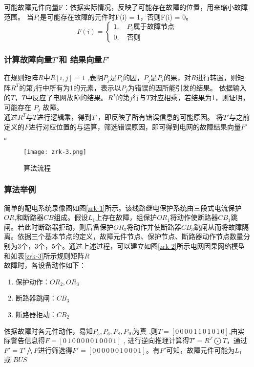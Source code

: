 \documentclass[withoutpreface,bwprint]{cumcmthesis} %
\begin{document}
可能故障元件向量F：依据实际情况，反映了可能存在故障的位置，用来缩小故障范围。
当$P_i$是可能存在故障的元件时F(i) = 1，否则F(i) = 0。
\begin{equation}
    F(i) = 
    \begin{cases}
        1 , \quad P_i\text{属于故障节点} \\
        0 , \quad \text{否则}
    \end{cases}
\end{equation}

\subsubsection{计算故障向量$T'$和 结果向量$F'$}
在规则矩阵$R$中$R[i,j] = 1$ ,表明$P_j$是$P_i$的因，$P_j$是$P_i$的果，对$R$进行转置，则矩阵$R^T$的第$j$行中所有为1的元素，表示以$P_j$为错误的因所能引发的结果。
依据输入的$T$，$T$中反应了电网故障的结果。$R^T$的第$j$行与$T$对应相乘，若结果为1，则证明，可能存在 $P_j$ 故障。\\ 
\indent 通过$R^T$与$T$进行逻辑乘，得到$T'$，即反映了所有错误信息的可能原因。 将$T'$与之前定义的$F$进行对应位置的与运算，筛选错误原因，即可得到电网的故障结果向量$F'$。

\begin{figure}[htbp]
    \centering
    \texttt{[image: zrk-3.png]}
    \caption{算法流程}
\end{figure}

\subsubsection{算法举例}
简单的配电系统录像图如图\ref{zrk-1}所示。该线路继电保护系统由三段式电流保护$OR$,和断路器$CB$组成。假设$L_1$上存在故障，组保护$OR_1$将动作使断路器$CB_1$跳闸。若此时断路器拒动，则后备保护$OR_3$将动作并使断路器$CB_3$跳闸从而将故障隔离。依据三个基本节点的定义，故障元件节点、保护节点、断路器动作节点数量分别为3个，3个，5个。通过上述过程，可以建立如图\ref{zrk-2}所示电网因果网络模型和如表\ref{zrk-3}所示规则矩阵$R$\\
\indent 故障时，各设备动作如下：
\begin{enumerate}[itemindent=4em]
    \item 保护动作：$OR_2 , OR_3$
    \item 断路器跳闸：$CB_3$
    \item 断路器拒动：$CB_2$
\end{enumerate}
依据故障时各元件动作，易知$P_5 , P_6 , P_8 , P_{10}$为真 ,则$T = [0\,0\,0\,0\,1\,1\,0\,1\,0\,1\,0]$,由实际警告信息得$ F = [0\,1\,0\,0\,0\,0\,0\,1\,0\,0\,0\,1]$ , 进行逆向推理计算得$T' = R^T \bigodot  T$，通过$F' = T' \bigwedge F$进行筛选得$F' =  [0\,0\,0\,0\,0\,0\,1\,0\,0\,0\,1]$。有$F'$可知，故障元件可能为$L_1$ 或 $BUS$
\end{document}
